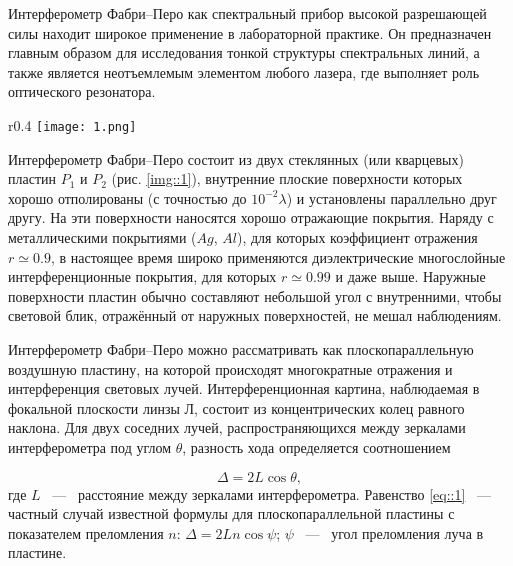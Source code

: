 Интерферометр Фабри–Перо как спектральный прибор высокой разрешающей
силы находит широкое применение в лабораторной практике.
Он предназначен главным образом для исследования тонкой структуры
спектральных линий, а также является неотъемлемым элементом любого лазера,
 где выполняет роль оптического резонатора.

 \begin{wrapfigure}{r}{0.4\linewidth}
    \texttt{[image: 1.png]}
    \caption{Интерферометр Фабри–Перо}
    \label{img::1}
 \end{wrapfigure}

\par Интерферометр Фабри–Перо состоит из двух стеклянных (или кварцевых) 
пластин $P_1$ и $P_2$ (рис. \ref{img::1}), внутренние плоские поверхности 
которых хорошо отполированы (с точностью до $10^{-2}\lambda$) и установлены
параллельно друг другу. На эти поверхности наносятся хорошо отражающие покрытия.
Наряду с металлическими покрытиями ($Ag$, $Al$), для которых
коэффициент отражения $r \simeq 0.9$, в настоящее время широко 
применяются диэлектрические многослойные интерференционные 
покрытия, для которых $r \simeq 0.99$ и даже выше. 
Наружные поверхности пластин обычно составляют небольшой угол 
с внутренними, чтобы световой блик, отражённый от наружных 
поверхностей, не мешал наблюдениям.

Интерферометр Фабри–Перо можно рассматривать как плоскопараллельную 
воздушную пластину, на которой происходят многократные отражения и 
интерференция световых лучей. 
Интерференционная картина, наблюдаемая в фокальной плоскости 
линзы $Л$, состоит из концентрических колец равного наклона. 
Для двух соседних лучей, распространяющихся между зеркалами 
интерферометра под углом $\theta$, разность хода определяется соотношением

\begin{equation}\label{eq::1}
  \Delta = 2L \cos{\theta},
\end{equation}
\noindent где $L$ ~---~ расстояние между зеркалами интерферометра. 
Равенство \eqref{eq::1} ~---~ частный случай известной формулы для плоскопараллельной пластины
с показателем преломления $n$: $\Delta = 2Ln \cos{\psi}$;
$\psi$ ~---~ угол преломления луча в пластине.

